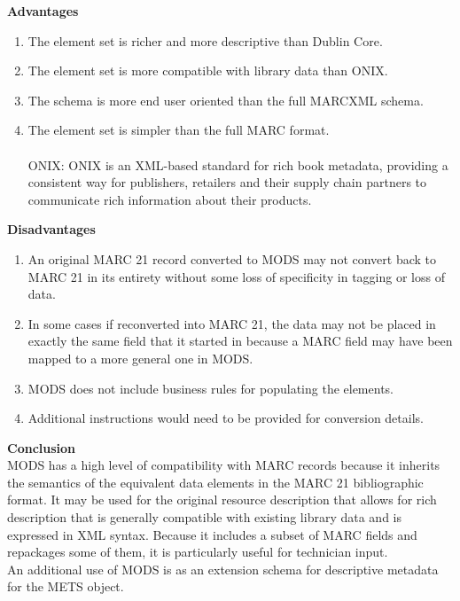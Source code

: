 \begin{enumerate}
	{\bf Advantages}
	\begin{enumerate}
		\item The element set is richer and more descriptive than Dublin Core.
		\item The element set is more compatible with library data than ONIX.
		\item The schema is more end user oriented than the full MARCXML schema.
		\item The element set is simpler than the full MARC format. 
		\\\\ONIX: ONIX is an XML-based standard for rich book metadata, providing a consistent way for publishers, retailers and their supply chain partners to communicate rich information about their products.
	\end{enumerate}	
	{\bf Disadvantages}
	\begin{enumerate}
		\item An original MARC 21 record converted to MODS may not convert back to MARC 21 in its entirety without some loss of specificity in tagging or loss of data.
		\item In some cases if reconverted into MARC 21, the data may not be placed in exactly the same field that it started in because a MARC field may have been mapped to a more general one in MODS.
		\item MODS does not include business rules for populating the elements.
		\item Additional instructions would need to be provided for conversion details.
	\end{enumerate}
	{\bf Conclusion}\\
	MODS has a high level of compatibility with MARC records because it inherits the semantics of the equivalent data elements in the MARC 21 bibliographic format. 
	It may be used for the original resource description that allows for rich description that is generally compatible with existing library data and is expressed in XML syntax. 
	Because it includes a subset of MARC fields and repackages some of them, it is particularly useful for technician input.\\
	An additional use of MODS is as an extension schema for descriptive metadata for the METS object.
	
	

\end{enumerate}
